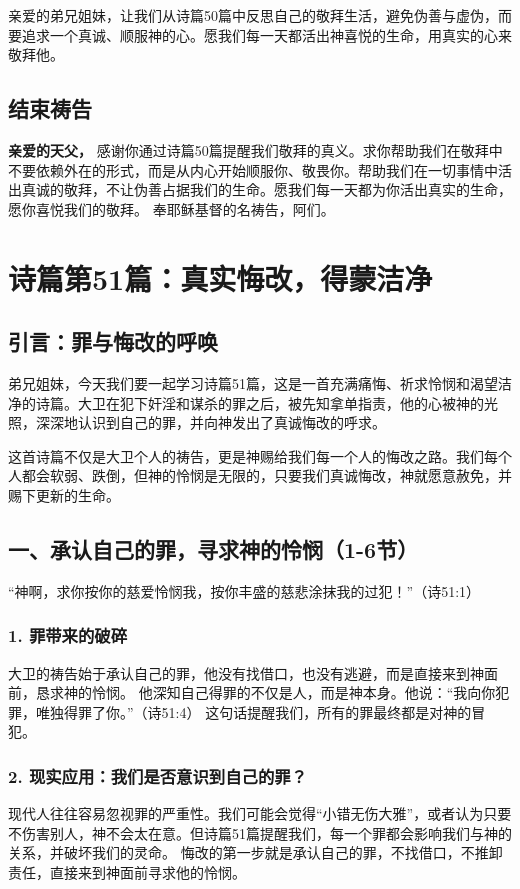 \documentclass[a4paper, 12pt]{article}
\begin{document}
亲爱的弟兄姐妹，让我们从诗篇50篇中反思自己的敬拜生活，避免伪善与虚伪，而要追求一个真诚、顺服神的心。愿我们每一天都活出神喜悦的生命，用真实的心来敬拜他。

\subsection*{结束祷告}
\textbf{亲爱的天父，}
感谢你通过诗篇50篇提醒我们敬拜的真义。求你帮助我们在敬拜中不要依赖外在的形式，而是从内心开始顺服你、敬畏你。帮助我们在一切事情中活出真诚的敬拜，不让伪善占据我们的生命。愿我们每一天都为你活出真实的生命，愿你喜悦我们的敬拜。
奉耶稣基督的名祷告，阿们。
\newpage
\section{诗篇第51篇：真实悔改，得蒙洁净}

\subsection*{引言：罪与悔改的呼唤}
\hspace{0.6cm}弟兄姐妹，今天我们要一起学习诗篇51篇，这是一首充满痛悔、祈求怜悯和渴望洁净的诗篇。大卫在犯下奸淫和谋杀的罪之后，被先知拿单指责，他的心被神的光照，深深地认识到自己的罪，并向神发出了真诚悔改的呼求。

这首诗篇不仅是大卫个人的祷告，更是神赐给我们每一个人的悔改之路。我们每个人都会软弱、跌倒，但神的怜悯是无限的，只要我们真诚悔改，神就愿意赦免，并赐下更新的生命。
\subsection*{一、承认自己的罪，寻求神的怜悯（1-6节）}
“神啊，求你按你的慈爱怜悯我，按你丰盛的慈悲涂抹我的过犯！”（诗51:1）

\subsubsection*{1. 罪带来的破碎}
大卫的祷告始于承认自己的罪，他没有找借口，也没有逃避，而是直接来到神面前，恳求神的怜悯。
他深知自己得罪的不仅是人，而是神本身。他说：“我向你犯罪，唯独得罪了你。”（诗51:4） 这句话提醒我们，所有的罪最终都是对神的冒犯。
\subsubsection*{2. 现实应用：我们是否意识到自己的罪？}
现代人往往容易忽视罪的严重性。我们可能会觉得“小错无伤大雅”，或者认为只要不伤害别人，神不会太在意。但诗篇51篇提醒我们，每一个罪都会影响我们与神的关系，并破坏我们的灵命。
悔改的第一步就是承认自己的罪，不找借口，不推卸责任，直接来到神面前寻求他的怜悯。
\end{document}
